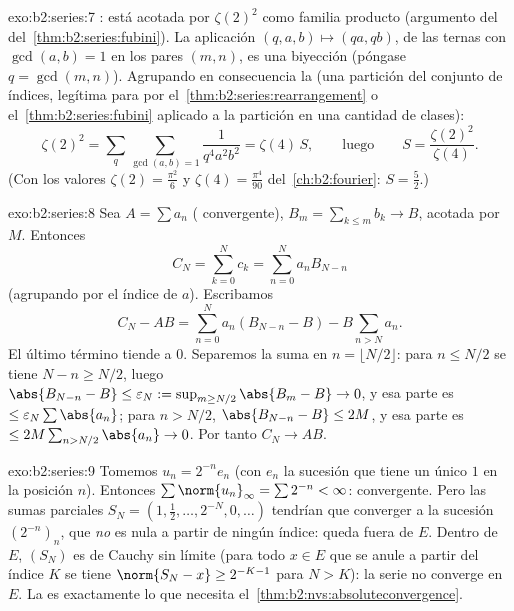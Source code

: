 \begin{solution}{exo:b2:series:7}
: está acotada por $\zeta(2)^2$ como familia producto
(argumento del  del~\cref{thm:b2:series:fubini}). La aplicación $(q, a, b) \mapsto (qa,
qb)$, de las ternas con $\gcd(a, b) = 1$ en los pares $(m, n)$, es
una biyección (póngase $q = \gcd(m,n)$). Agrupando en consecuencia
la  (una partición del conjunto de índices,
legítima para  por el~\cref{thm:b2:series:rearrangement} o el~\cref{thm:b2:series:fubini} aplicado a la partición en una cantidad
 de clases):
\[
\zeta(2)^2 = \sum_{q} \sum_{\gcd(a,b)=1} \frac{1}{q^4 a^2 b^2}
= \zeta(4)\, S,
\qquad\text{luego}\qquad
S = \frac{\zeta(2)^2}{\zeta(4)} .
\]
(Con los valores $\zeta(2) = \frac{\pi^2}{6}$ y $\zeta(4) =
\frac{\pi^4}{90}$ del~\cref{ch:b2:fourier}: $S = \frac{5}{2}$.)
\end{solution}

\begin{solution}{exo:b2:series:8}
Sea $A = \sum a_n$ ( convergente), $B_m = \sum_{k\leq
m} b_k \to B$, acotada por $M$. Entonces
\[
C_N = \sum_{k=0}^{N} c_k = \sum_{n=0}^{N} a_n B_{N-n}
\]
(agrupando por el índice de $a$). Escribamos
\[
C_N - AB = \sum_{n=0}^{N} a_n (B_{N-n} - B) - B\sum_{n > N} a_n .
\]
El último término tiende a $0$. Separemos la suma en $n = \lfloor
N/2 \rfloor$: para $n \leq N/2$ se tiene $N - n \geq N/2$, luego
$\abs{B_{N-n} - B} \leq \varepsilon_N := \sup_{m \geq
N/2}\abs{B_m - B} \to 0$, y esa parte es $\leq \varepsilon_N
\sum\abs{a_n}$; para $n > N/2$, $\abs{B_{N-n} - B} \leq 2M$, y esa
parte es $\leq 2M \sum_{n > N/2} \abs{a_n} \to 0$. Por tanto $C_N
\to AB$.
\end{solution}

\begin{solution}{exo:b2:series:9}
Tomemos $u_n = 2^{-n} e_n$ (con $e_n$ la sucesión que tiene un único
$1$ en la posición $n$). Entonces $\sum \norm{u_n}_\infty = \sum
2^{-n} < \infty$:  convergente. Pero las sumas
parciales $S_N = (1, \tfrac12, \dots, 2^{-N}, 0, \dots)$ tendrían
que converger a la sucesión $(2^{-n})_n$, que \emph{no} es nula a
partir de ningún índice: queda fuera de $E$. Dentro de $E$, $(S_N)$
es de Cauchy sin límite (para todo $x \in E$ que se anule a partir
del índice $K$ se tiene $\norm{S_N - x} \geq 2^{-K-1}$ para $N >
K$): la serie no converge en $E$. La  es exactamente lo
que necesita el~\cref{thm:b2:nvs:absoluteconvergence}.
\end{solution}

